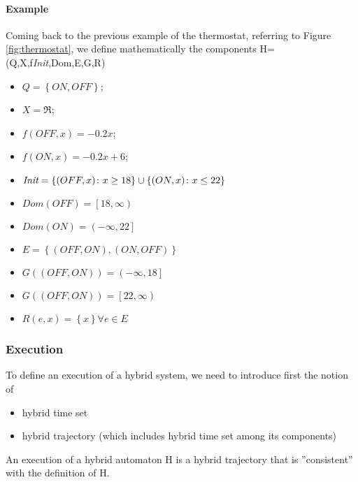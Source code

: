 \paragraph{Example}
Coming back to the previous example of the thermostat, referring to Figure \ref{fig:thermostat}, we define mathematically the components H=(Q,X,f\textit{Init},Dom,E,G,R)
\begin{itemize}
	\item $Q=\left\{ON,OFF\right\}$;
	\item $X=\Re$;
	\item $f(OFF,x)=-0.2x$; 
	\item $f(ON,x)=-0.2x+6$;
	\item $\emph{Init}=\left\{(OFF,x)\colon x\ge18\right\} \cup \left\{(ON,x)\colon x\le22\right\}$ 
	\item $Dom(OFF)=\left[18,\infty \right)$
	\item $Dom(ON)=\left(-\infty,22\right]$
	\item $E=\left\{(OFF,ON),(ON,OFF)\right\}$
	\item$G((OFF,ON))=\left(-\infty,18\right]$
	\item$G((OFF,ON))=\left[22,\infty\right)$
	\item$R(e,x)=\left\{x \right\} \forall e \in E$
\end{itemize}
\subsubsection{Execution}
To define an execution of a hybrid system, we need to introduce first the notion of
\begin{itemize}
	\item hybrid time set
	\item hybrid trajectory (which includes hybrid time set among its components)
\end{itemize}

An execution of a hybrid automaton H is a hybrid trajectory that is ''consistent'' with the definition of H.

